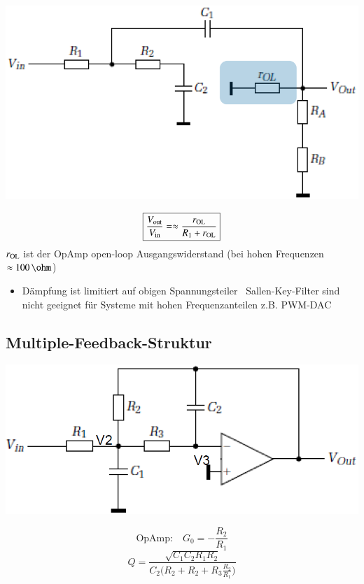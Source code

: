 \begin{minipage}[c]{0.4\columnwidth}  
    \includegraphics[width=\columnwidth]{images/sallen_key_hohe_frequenzen.png}
\end{minipage}
\hfill
\begin{minipage}[c]{0.58\columnwidth}
    $$ \boxed{ \frac{V_{\rm out}}{V_{\rm in}} = \approx \frac{r_{\rm OL}}{R_1 + r_{\rm OL}} }$$
    $r_{\rm OL}$ ist der OpAmp open-loop Ausgangswiderstand (bei hohen Frequenzen $\approx 100 \, \ohm$)
\end{minipage}

\begin{itemize}
    \item Dämpfung ist limitiert auf obigen Spannungsteiler
        \textrightarrow\ Sallen-Key-Filter sind nicht geeignet für Systeme mit hohen Frequenzanteilen z.B. PWM-DAC
\end{itemize}


\subsection{Multiple-Feedback-Struktur}

\begin{minipage}[c]{0.4\columnwidth}
    \includegraphics[width=\columnwidth]{images/aktive_filter_multiple_feedback.png}
\end{minipage}
\hfill
\begin{minipage}[c]{0.58\columnwidth}
    $$ \text{OpAmp:} \quad  G_0 = -\frac{R_2}{R_1} $$
    $$ Q = \frac{\sqrt{C_1 C_2 R_1 R_2}}{ C_2 \Big( R_2 + R_2 + R_3 \frac{R_2}{R_1} \Big)} $$
\end{minipage}

